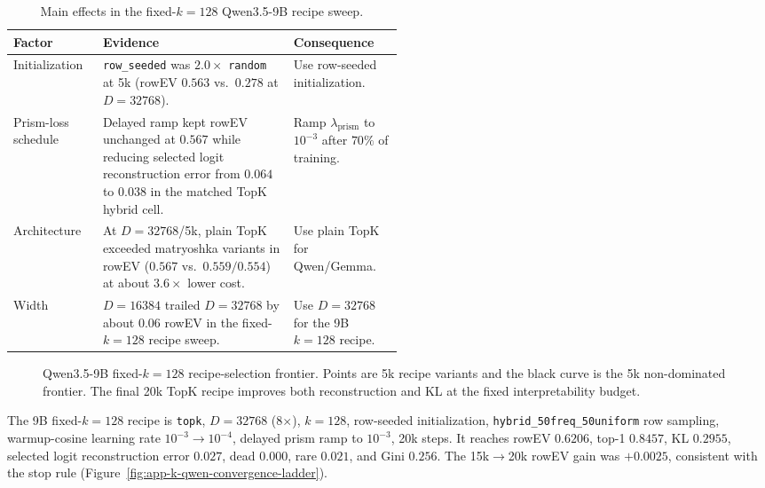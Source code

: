 \begin{table}[!tbp]
\caption{Main effects in the fixed-$k=128$ Qwen3.5-9B recipe sweep.}
\label{tab:app-k-qwen-recipe-effects}
\centering
\footnotesize
\setlength{\tabcolsep}{3pt}
\renewcommand{\arraystretch}{1.08}
\begin{tabularx}{\linewidth}{@{}>{\RaggedRight\arraybackslash}p{0.23\linewidth}Y>{\RaggedRight\arraybackslash}p{0.28\linewidth}@{}}
\toprule
Factor & Evidence & Consequence \\
\midrule
Initialization
& \texttt{row\_seeded} was $2.0\times$ \texttt{random} at 5k
(rowEV $0.563$ vs.\ $0.278$ at $D=32768$).
& Use row-seeded initialization. \\
\addlinespace
Prism-loss schedule
& Delayed ramp kept rowEV unchanged at $0.567$ while reducing selected logit
reconstruction error from $0.064$ to $0.038$ in the matched TopK hybrid cell.
& Ramp $\lambda_{\mathrm{prism}}$ to $10^{-3}$ after $70\%$ of training. \\
\addlinespace
Architecture
& At $D=32768$/5k, plain TopK exceeded matryoshka variants
\citep{bussmann2025matryoshka} in rowEV
($0.567$ vs.\ $0.559/0.554$) at about $3.6\times$ lower cost.
& Use plain TopK for Qwen/Gemma. \\
\addlinespace
Width
& $D=16384$ trailed $D=32768$ by about $0.06$ rowEV in the fixed-$k=128$
recipe sweep.
& Use $D=32768$ for the 9B $k=128$ recipe. \\
\bottomrule
\end{tabularx}
\end{table}

\begin{figure}[!tbp]
    \centering
    \caption{
        Qwen3.5-9B fixed-$k=128$ recipe-selection frontier. Points are 5k recipe
        variants and the black curve is the 5k non-dominated frontier. The final 20k TopK
        recipe improves both reconstruction and KL at the fixed
        interpretability budget.
    }
    \label{fig:app-k-qwen-recipe-selection-frontier}
\end{figure}

\ReadoutSAEFloatBarrier

The 9B fixed-$k=128$ recipe is \texttt{topk},
\(D=32768\) (8$\times$), $k=128$, row-seeded
initialization, \texttt{hybrid\_50freq\_50uniform} row sampling, warmup-cosine
learning rate $10^{-3}\rightarrow 10^{-4}$, delayed prism ramp to $10^{-3}$,
20k steps. It reaches rowEV $0.6206$, top-1 $0.8457$, KL $0.2955$,
selected logit reconstruction error $0.027$, dead $0.000$, rare $0.021$, and Gini
$0.256$. The 15k$\rightarrow$20k rowEV gain was $+0.0025$, consistent with the
stop rule (Figure~\ref{fig:app-k-qwen-convergence-ladder}).

